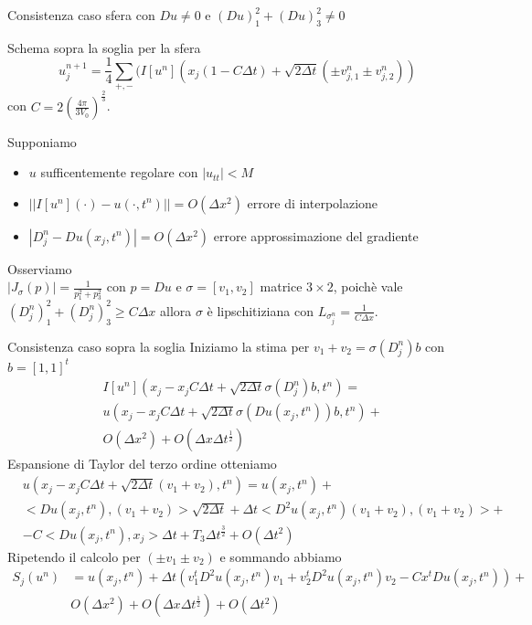 \begin{frame}{Consistenza caso sfera con $Du\neq 0$ e
    $(Du)_1^2+(Du)_3^2\neq 0$}
  \begin{alertblock}{Schema sopra la soglia per la sfera}
   \[
     u_j^{n+1}=\frac{1}{4}\sum_{+,-}(I[u^n](x_j(1-C\Delta
     t)+\sqrt{2\Delta t}(\pm v_{j,1}^n\pm v_{j,2}^n))
    \]
    con $C=2\left(\frac{4\pi}{3V_0}\right)^\frac{2}{3}$.
  \end{alertblock}
  Supponiamo
  \begin{itemize}
    \item $u$ sufficentemente regolare con $|u_{tt}|<M$
    \item $||I[u^n](\cdot)-u(\cdot,t^n)||=O(\Delta x^2)$ errore di
      interpolazione 
    \item $|D_j^n-Du(x_j,t^n)|=O(\Delta x^2)$ errore approssimazione
      del gradiente
   \end{itemize}
  Osserviamo \\ 
      $|J_{\sigma}(p)|=\frac{1}{p_1^2+p_3^2}$ con $p=Du$ e
      $\sigma=[v_1,v_2]$ matrice $3\times 2$,  poichè vale
      $(D_j^n)_1^2+(D_j^n)_3^2\geq C\Delta x$ allora $\sigma$ è
      lipschitiziana con $L_{\sigma_j^n}=\frac{1}{C\Delta x}$.  
 \end{frame}

\begin{frame}{Consistenza caso sopra la soglia}
Iniziamo la stima per \alert{$v_1+v_2=\sigma(D_j^n)b$} con $b=[1,1]^t$
\[
\begin{aligned}
  &I[u^n](x_j-x_jC\Delta t +\sqrt{2\Delta t}\sigma(D_j^n)b,t^n)=\\
  &u(x_j-x_jC\Delta t +\sqrt{2\Delta t}\sigma(Du(x_j,t^n))b,t^n)+\\
  &O(\Delta x^2) + O(\Delta x\Delta t^{\frac{1}{2}}) 
\end{aligned}
\]
Espansione di Taylor del terzo ordine otteniamo
\[
\begin{aligned}
&u(x_j-x_jC\Delta t +\sqrt{2\Delta
    t}(v_1+v_2),t^n)=u(x_j,t^n)+\\
&<Du(x_j,t^n),(v_1+v_2)>\sqrt{2\Delta t}+\Delta
  t<D^2u(x_j,t^n)(v_1+v_2),(v_1+v_2)>+\\
&-C<Du(x_j,t^n),x_j>\Delta t+T_3\Delta t^{\frac{3}{2}} +O(\Delta t^2)
\end{aligned}
\]
Ripetendo il calcolo per $(\pm v_1\pm v_2)$ e sommando abbiamo
\[
\begin{aligned}
S_j(u^n)&=u(x_j,t^n)+\Delta t(v_1^tD^2u(x_j,t^n)v_1+v_2^tD^2u(x_j,t^n)v_2-Cx^tDu(x_j,t^n))+\\
&O(\Delta x^2)+ O(\Delta x\Delta t^{\frac{1}{2}})+ O(\Delta t^2)
\end{aligned}
\]
\end{frame}

